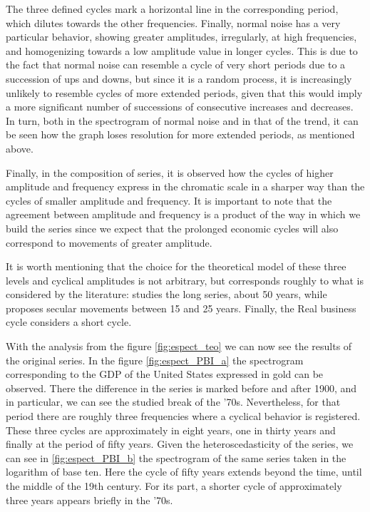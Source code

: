 \documentclass[a4paper]{article}
\begin{document}
	The three defined cycles mark a horizontal line in the corresponding period, which dilutes towards the other frequencies. Finally, normal noise has a very particular behavior, showing greater amplitudes, irregularly, at high frequencies, and homogenizing towards a low amplitude value in longer cycles. This is due to the fact that normal noise can resemble a cycle of very short periods due to a succession of ups and downs, but since it is a random process, it is increasingly unlikely to resemble cycles of more extended periods, given that this would imply a more significant number of successions of consecutive increases and decreases. In turn, both in the spectrogram of normal noise and in that of the trend, it can be seen how the graph loses resolution for more extended periods, as mentioned above.
	
	
	Finally, in the composition of series, it is observed how the cycles of higher amplitude and frequency express in the chromatic scale in a sharper way than the cycles of smaller amplitude and frequency. It is important to note that the agreement between amplitude and frequency is a product of the way in which we build the series since we expect that the prolonged economic cycles will also correspond to movements of greater amplitude.
	
	It is worth mentioning that the choice for the theoretical model of these three levels and cyclical amplitudes is not arbitrary, but corresponds roughly to what is considered by the literature: \cite{kondratieff1979long} studies the long series, about 50 years, while \cite {kuznets1930secular} proposes secular movements between 15 and 25 years. Finally, the Real business cycle \citep{kydland1982time} considers a short cycle.
	
	With the analysis from the figure \ref{fig:espect_teo} we can now see the results of the original series. In the figure \ref{fig:espect_PBI_a} the spectrogram corresponding to the GDP of the United States expressed in gold can be observed. There the difference in the series is marked before and after 1900, and in particular, we can see the studied break of the '70s. Nevertheless, for that period there are roughly three frequencies where a cyclical behavior is registered. These three cycles are approximately in eight years, one in thirty years and finally at the period of fifty years. Given the heteroscedasticity of the series, we can see in \ref{fig:espect_PBI_b} the spectrogram of the same series taken in the logarithm of base ten. Here the cycle of fifty years extends beyond the time, until the middle of the 19th century. For its part, a shorter cycle of approximately three years appears briefly in the '70s.
	
\end{document}
